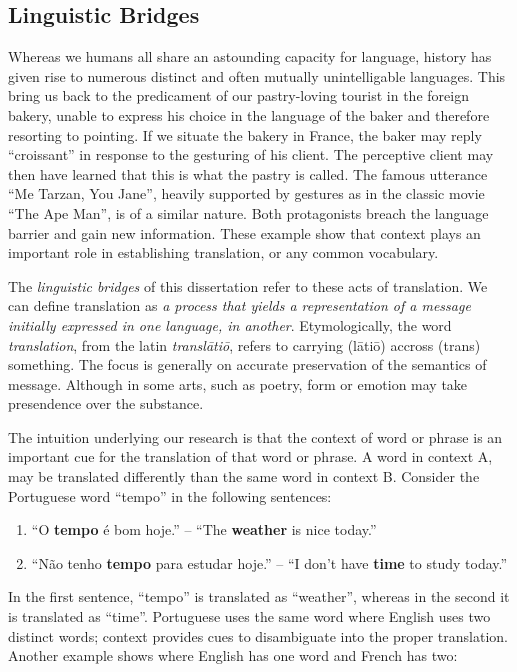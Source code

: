 \subsection{Linguistic Bridges}

Whereas we humans all share an astounding capacity for language, history has
given rise to numerous distinct and often mutually unintelligable languages.
This bring us back to the predicament of our pastry-loving tourist in the
foreign bakery, unable to express his choice in the language of the baker and
therefore resorting to pointing. If we situate the bakery in France, the baker
may reply ``croissant'' in response to the gesturing of his client. The
perceptive client may then have learned that this is what the pastry is called.
The famous utterance ``Me Tarzan, You Jane'', heavily supported by gestures as
in the classic movie ``The Ape Man'', is of a similar nature. Both protagonists
breach the language barrier and gain new information. These example show that
context plays an important role in establishing translation, or any common
vocabulary. 

The \emph{linguistic bridges} of this dissertation refer to these acts of
translation. We can define translation as \emph{a process that yields a
representation of a message initially expressed in one language, in another}.
Etymologically, the word \emph{translation}, from the latin \emph{transl\=ati\=o},
refers to carrying (l\=ati\=o) accross (trans) something. The focus is generally on
accurate preservation of the semantics of message.  Although in some arts, such
as poetry, form or emotion may take presendence over the substance.

The intuition underlying our research is that the context of word or phrase is
an important cue for the translation of that word or phrase. A word in context
A, may be translated differently than the same word in context B. Consider the
Portuguese word ``tempo'' in the following sentences:

\begin{enumerate}
\item ``O \textbf{tempo} é bom hoje.'' -- ``The \textbf{weather} is nice today.''
\item ``Não tenho \textbf{tempo} para estudar hoje.'' -- ``I don't have \textbf{time} to study today.''
\end{enumerate}

In the first sentence, ``tempo'' is translated as ``weather'', whereas in the
second it is translated as ``time''. Portuguese uses the same word where
English uses two distinct words; context provides cues to disambiguate into the
proper translation. Another example shows where English has one word and French has two:

